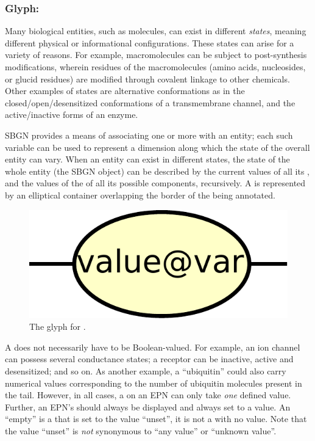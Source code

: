 \subsubsection{Glyph: }
\label{sec:stateVariable}

Many biological entities, such as molecules, can exist in different \emph{states}, meaning different physical or informational configurations.  These states can arise for a variety of reasons.  For example, macromolecules can be subject to post-synthesis modifications, wherein residues of the macromolecules (amino acids, nucleosides, or glucid residues) are modified through covalent linkage to other chemicals.  Other examples of states are alternative conformations as in the closed/open/desensitized conformations of a transmembrane channel, and the active/inactive forms of an enzyme.

SBGN provides a means of associating one or more  with an entity; each such variable can be used to represent a dimension along which the state of the overall entity can vary.  When an entity can exist in different states, the state of the whole entity (\ie the SBGN object) can be described by the current values of all its , and the values of the  of all its possible components, recursively. A  is represented by an elliptical container overlapping the border of the  being annotated.

\begin{figure}[H]
  \centering
  \includegraphics[scale = 0.3, trim = 0 0 0 0.25in]{le_images/stateVariable}
  \caption{The \PD glyph for .}
  \label{fig:state-var}
\end{figure}
 
A  does not necessarily have to be Boolean-valued.  For example, an ion channel can possess several conductance states; a receptor can be inactive, active and desensitized; and so on.  As another example, a  ``ubiquitin'' could also carry numerical values corresponding to the number of ubiquitin molecules present in the tail.  However, in all cases, a  on an EPN can only take \emph{one} defined value.  Further, an EPN's  should always be displayed and always set to a value.  An ``empty''  is a  that is set to the value ``unset'', it is not a  with no value. Note that the value ``unset'' is \emph{not} synonymous to ``any value'' or ``unknown value''.




